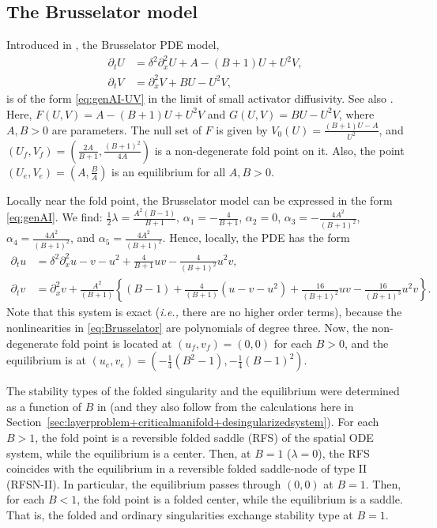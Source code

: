 \documentclass[11pt]{article}
\numberwithin{equation}{section}
\begin{document}
\subsection{The Brusselator model} \label{ex:Brusselator}
Introduced in \cite{PL1968}, the Brusselator PDE model,  
    \begin{equation}\label{eq:Brusselator}
        \begin{split}
        \partial_t U &= \delta^2 \partial_x^2 U + A - (B+1) U + U^2V, \\
        \partial_t V &= \partial_x^2 V + BU - U^2V,
        \end{split}
    \end{equation}
is of the form \eqref{eq:genAI-UV} in the limit of small activator diffusivity. 
See also \cite{CH1993,EP1998,GS1997,Pena2001, S2003, SZJV2018, W1997}. 
Here, $F(U,V)= A -(B+1)U + U^2V$
    and $G(U,V)=BU - U^2V $, where $A,B>0$ are parameters.
    The null set of $F$ is given by $V_0(U)=\frac{(B+1)U - A}{U^2}$, and
    $(U_f,V_f)=\left(\frac{2A}{B+1},\frac{ (B+1)^2}{4A} \right)$ is a non-degenerate fold point on it.
    Also, the point $(U_e,V_e)=\left(A,\frac{B}{A}\right)$ is an equilibrium for all $A,B>0$. 
    
Locally near the fold point, the Brusselator model can be expressed in the form \eqref{eq:genAI}.
We find: $\frac{1}{2}\lambda=\frac{A^2(B-1)}{B+1}$,
    $\alpha_1= -\frac{4}{B+1}$, 
    $\alpha_2= 0$,
    $\alpha_3= -\frac{4A^2}{(B+1)^2}$,
    $\alpha_4= \frac{4A^2}{(B+1)^2}$, and
    $\alpha_5= \frac{4A^2}{(B+1)^2}$.
Hence, locally, the PDE has the form 
    \begin{equation}\label{eq:Brusselator-nf}
        \begin{split}
            \partial_t u &= \delta^2 \partial_x^2 u -v -u^2 +\frac{4}{B+1} uv - \frac{4}{(B+1)^2}u^2v, \\
        \partial_t v &= \partial_x^2 v +\frac{A^2}{(B+1)}
        \left\{ (B-1) + \frac{4}{(B+1)}(u-v-u^2) + \frac{16}{(B+1)^2} uv - \frac{16}{(B+1)^3} u^2v \right\}.
        \end{split}
    \end{equation}
Note that this system is exact ({\it i.e.,} there are no higher order terms), because the nonlinearities in \eqref{eq:Brusselator} are polynomials of degree three.
Now, the non-degenerate fold point is located at $(u_f,v_f)=(0,0)$ for each $B>0$, and the equilibrium is at $(u_e,v_e)=\left(-\frac{1}{4}(B^2-1),-\frac{1}{4}(B-1)^2\right)$.

The stability types of the folded singularity and the equilibrium were determined as a function of $B$ in \cite{JDKV2026} (and they also follow from the calculations here in Section~\ref{sec:layerproblem+criticalmanifold+desingularizedsystem}).
For each $B>1$, the fold point is a reversible folded saddle (RFS) of the spatial ODE system, while the equilibrium is a center.
Then, at $B=1$ ($\lambda=0$), the RFS coincides with the equilibrium in a reversible folded saddle-node of type II (RFSN-II).
In particular, the equilibrium passes through $(0,0)$ at $B=1$. 
Then, for each $B<1$, the fold point is a folded center, while the equilibrium is a saddle.
That is, the folded and ordinary singularities exchange stability type at $B=1$. 
\end{document}
